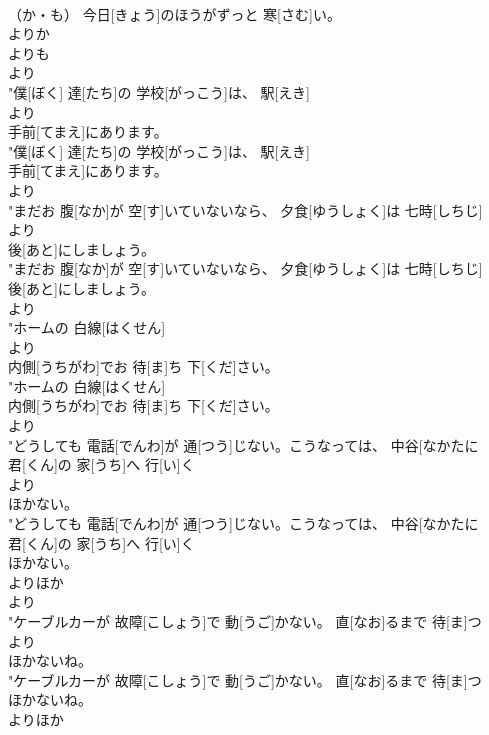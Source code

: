 \documentclass[8pt]{extreport}
\begin{document}
\begin{CJK}{UTF8}{min}
\\	（か・も） 今日[きょう]のほうがずっと 寒[さむ]い。
\\	よりか 
\\	よりも	
\\	より
\\	"僕[ぼく] 達[たち]の 学校[がっこう]は、 駅[えき]
\\	より
\\	手前[てまえ]にあります。
\\	"僕[ぼく] 達[たち]の 学校[がっこう]は、 駅[えき]
\\	手前[てまえ]にあります。
\\	より
\\	"まだお 腹[なか]が 空[す]いていないなら、 夕食[ゆうしょく]は 七時[しちじ]
\\	より
\\	後[あと]にしましょう。
\\	"まだお 腹[なか]が 空[す]いていないなら、 夕食[ゆうしょく]は 七時[しちじ]
\\	後[あと]にしましょう。
\\	より
\\	"ホームの 白線[はくせん]
\\	より
\\	内側[うちがわ]でお 待[ま]ち 下[くだ]さい。
\\	"ホームの 白線[はくせん]
\\	内側[うちがわ]でお 待[ま]ち 下[くだ]さい。
\\	より
\\	"どうしても 電話[でんわ]が 通[つう]じない。こうなっては、 中谷[なかたに 
\\	君[くん]の 家[うち]へ 行[い]く
\\	より
\\	ほかない。
\\	"どうしても 電話[でんわ]が 通[つう]じない。こうなっては、 中谷[なかたに 
\\	君[くん]の 家[うち]へ 行[い]く
\\	ほかない。
\\	よりほか 
\\	より
\\	"ケーブルカーが 故障[こしょう]で 動[うご]かない。 直[なお]るまで 待[ま]つ
\\	より
\\	ほかないね。
\\	"ケーブルカーが 故障[こしょう]で 動[うご]かない。 直[なお]るまで 待[ま]つ
\\	ほかないね。
\\	よりほか 

\end{CJK}
\end{document}
